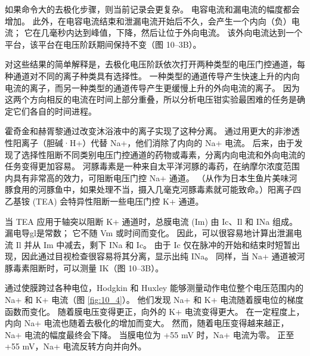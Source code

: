 如果命令大的去极化步骤，则当前记录会更复杂。 
电容电流和漏电流的幅度都会增加。 
此外，在电容电流结束和泄漏电流开始后不久，会产生一个内向（负）电流； 它在几毫秒内达到峰值，下降，然后让位于外向电流。 
该外向电流达到一个平台，该平台在电压阶跃期间保持不变（图 10–3B）。


对这些结果的简单解释是，去极化电压阶跃依次打开两种类型的电压门控通道，每种通道对不同的离子种类具有选择性。 
一种类型的通道传导产生快速上升的内向电流的离子，而另一种类型的通道传导产生更缓慢上升的外向电流的离子。 
因为这两个方向相反的电流在时间上部分重叠，所以分析电压钳实验最困难的任务是确定它们各自的时间进程。


霍奇金和赫胥黎通过改变沐浴液中的离子实现了这种分离。 通过用更大的非渗透性阳离子（胆碱·H+）代替 Na+，他们消除了内向的 Na+ 电流。 
后来，由于发现了选择性阻断不同类别电压门控通道的药物或毒素，分离内向电流和外向电流的任务变得更加容易。 
河豚毒素是一种来自太平洋河豚的毒药，在纳摩尔浓度范围内具有非常高的效力，可阻断电压门控 Na+ 通道。 
（从作为日本生鱼片美味河豚食用的河豚鱼中，如果处理不当，摄入几毫克河豚毒素就可能致命。）阳离子四乙基铵 (TEA) 会特异性阻断一些电压门控 K+ 通道。


当 TEA 应用于轴突以阻断 K+ 通道时，总膜电流 (Im) 由 Ic、Il 和 INa 组成。 
漏电导gl是常数； 它不随 Vm 或时间而变化。 因此，可以很容易地计算出泄漏电流 Il 并从 Im 中减去，剩下 INa 和 Ic。 
由于 Ic 仅在脉冲的开始和结束时短暂出现，因此通过目视检查很容易将其分离，显示出纯 INa。 
同样，当 Na+ 通道被河豚毒素阻断时，可以测量 IK（图 10–3B）。


通过使膜跨过各种电位，Hodgkin 和 Huxley 能够测量动作电位整个电压范围内的 Na+ 和 K+ 电流（图 \ref{fig:10_4}）。 
他们发现 Na+ 和 K+ 电流随着膜电位的梯度函数而变化。 
随着膜电压变得更正，向外的 K+ 电流变得更大。 
在一定程度上，内向 Na+ 电流也随着去极化的增加而变大。 
然而，随着电压变得越来越正，Na+ 电流的幅度最终会下降。 
当膜电位为 +55 mV 时，Na+ 电流为零。 
正至 +55 mV，Na+ 电流反转方向并向外。

